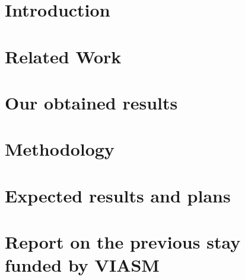 \documentclass[10pt,notitlepage]{article}
\begin{document}


\section{Introduction}
\label{sec:Introduction}


\section{Related Work}
\label{sec:RelatedWork}


\section{Our obtained results}
\label{sec:CurrentResults}


\section{Methodology}
\label{sec:Methodology}


\section{Expected results and plans}
\label{sec:Results}



\section{Report on the previous stay funded by VIASM}
\label{sec:PreviousStay}

\end{document}
